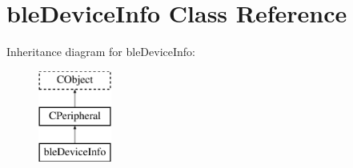 \hypertarget{classble_device_info}{\section{ble\-Device\-Info Class Reference}
\label{classble_device_info}
}
Inheritance diagram for ble\-Device\-Info\-:\begin{figure}[H]
\begin{center}
\leavevmode
\includegraphics[height=3.000000cm]{classble_device_info}
\end{center}
\end{figure}
